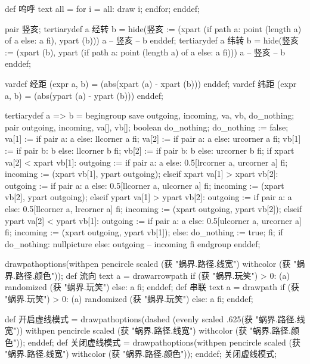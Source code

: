 def 呜呼 text all =
  for i = all: draw i; endfor;
enddef;
\stopMPinclusions

\startMPinclusions[+]
pair 竖亥;
tertiarydef a 经转 b =
  hide(竖亥 := (xpart (if path a: point (length a) of a else: a fi), ypart (b)))
  a -- 竖亥 -- b
enddef;
tertiarydef a 纬转 b =
  hide(竖亥 := (xpart (b), ypart (if path a: point (length a) of a else: a fi)))
  a --  竖亥 -- b
enddef;
\stopMPinclusions

\startMPinclusions[+]
vardef 经距 (expr a, b) = (abs(xpart (a) - xpart (b))) enddef;
vardef 纬距 (expr a, b) = (abs(ypart (a) - ypart (b))) enddef;
\stopMPinclusions

\startMPinclusions[+]
tertiarydef a => b =
  begingroup
    save outgoing, incoming, va, vb, do_nothing;
    pair outgoing, incoming, va[], vb[];
    boolean do_nothing; do_nothing := false;
    va[1] := if pair a: a else: llcorner a fi;
    va[2] := if pair a: a else: urcorner a fi;
    vb[1] := if pair b: b else: llcorner b fi;
    vb[2] := if pair b: b else: urcorner b fi;
    if xpart va[2] < xpart vb[1]: %
      outgoing := if pair a: a else: 0.5[lrcorner a, urcorner a] fi;
      incoming  := (xpart vb[1], ypart outgoing);
    elseif xpart va[1] > xpart vb[2]: %
      outgoing := if pair a: a else: 0.5[llcorner a, ulcorner a] fi;
      incoming  := (xpart vb[2], ypart outgoing);
    elseif ypart va[1] > ypart vb[2]: %
      outgoing := if pair a: a else: 0.5[llcorner a, lrcorner a] fi;
      incoming  := (xpart outgoing, ypart vb[2]);
    elseif ypart va[2] < ypart vb[1]: %
      outgoing := if pair a: a else: 0.5[ulcorner a, urcorner a] fi;
      incoming  := (xpart outgoing, ypart vb[1]);
    else:
      do_nothing := true;
    fi;
    if do_nothing: nullpicture else: outgoing -- incoming fi
  endgroup
enddef;

drawpathoptions(withpen pencircle scaled (获 "蜗界.路径.线宽") withcolor (获 "蜗界.路径.颜色"));
def 流向 text a =
  drawarrowpath if (获 "蜗界.玩笑") > 0: (a) randomized (获 "蜗界.玩笑") else: a fi;
enddef;
def 串联 text a =
  drawpath if (获 "蜗界.玩笑") > 0: (a) randomized (获 "蜗界.玩笑") else: a fi;  
enddef;
\stopMPinclusions

\startMPinclusions[+]
def 开启虚线模式 =
  drawpathoptions(dashed (evenly scaled .625(获 "蜗界.路径.线宽"))
                  withpen pencircle scaled (获 "蜗界.路径.线宽")
                  withcolor (获 "蜗界.路径.颜色"));
enddef;
def 关闭虚线模式 =
  drawpathoptions(withpen pencircle scaled (获 "蜗界.路径.线宽")
                  withcolor (获 "蜗界.路径.颜色"));
enddef;
关闭虚线模式;
\stopMPinclusions

